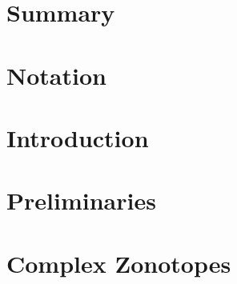 \documentclass[11pt,a4paper,twoside,openright]{book}
\begin{document}
\pagestyle{empty}


\frontmatter
\pagestyle{plain}

% 
% 
% 
\chapter{Summary} 
% 
% 
\cleardoublepage
{}
\tableofcontents
\listofalgorithms

\chapter*{Notation} 

\mainmatter 
\pagestyle{fancy}

\chapter{Introduction} 
%
\chapter{Preliminaries} \label{sec:prelim} 
% 
\chapter{Complex Zonotopes} \label{sec:ch1} 
%
\end{document}
